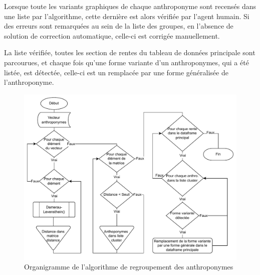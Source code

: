 Lorsque toute les variants graphiques de chaque anthroponyme sont recensés dans une liste par l'algorithme, cette dernière est alors vérifiée par l'agent humain. Si des erreurs sont remarquées au sein de la liste des groupes, en l'absence de solution de correction automatique, celle-ci est corrigée manuellement.

La liste vérifiée, toutes les section de rentes du tableau de données principale sont parcourues, et chaque fois qu'une forme variante d'un anthroponymes, qui a été listée, est détectée, celle-ci est un remplacée par une forme généralisée de l'anthroponyme. 

\begin{figure} %
    \centering
    \includegraphics[scale=0.75]{2.Methods/Img/clustering.drawio.pdf} 
    \caption{Organigramme de l'algorithme de regroupement des anthroponymes}
    \label{schemaClustering}
\end{figure}


